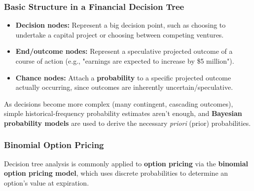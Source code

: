 \documentclass[12pt,openany]{book}
\begin{document}
\subsubsection{Basic Structure in a Financial Decision Tree}

\begin{itemize}[leftmargin=*]
    \item \textbf{Decision nodes:} Represent a big decision point, such as choosing to undertake a capital project or choosing between competing ventures.
    \item \textbf{End/outcome nodes:} Represent a speculative projected outcome of a course of action (e.g., "earnings are expected to increase by \$5 million").
    \item \textbf{Chance nodes:} Attach a \textbf{probability} to a specific projected outcome actually occurring, since outcomes are inherently uncertain/speculative.

\end{itemize}

As decisions become more complex (many contingent, cascading outcomes), simple historical-frequency probability estimates aren't enough, and \textbf{Bayesian probability models} are used to derive the necessary \textit{priori} (prior) probabilities.

\subsubsection{Binomial Option Pricing}


Decision tree analysis is commonly applied to \textbf{option pricing} via the \textbf{binomial option pricing model}, which uses discrete probabilities to determine an option's value at expiration.
\end{document}

